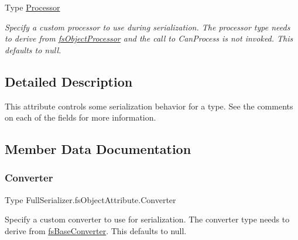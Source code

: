 \begin{DoxyCompactItemize}
Type \hyperlink{class_full_serializer_1_1fs_object_attribute_a2f71f5d718abe0eb30544ff6f8510664}{Processor}
\begin{DoxyCompactList}\small\item\em Specify a custom processor to use during serialization. The processor type needs to derive from \hyperlink{class_full_serializer_1_1fs_object_processor}{fs\+Object\+Processor} and the call to Can\+Process is not invoked. This defaults to null. \end{DoxyCompactList}\end{DoxyCompactItemize}


\subsection{Detailed Description}
This attribute controls some serialization behavior for a type. See the comments on each of the fields for more information. 



\subsection{Member Data Documentation}
\mbox{\label{class_full_serializer_1_1fs_object_attribute_abe3f1e8c04164f6d951c70c15870df71}} 
\subsubsection{\texorpdfstring{Converter}{Converter}}
{\footnotesize\ttfamily Type Full\+Serializer.\+fs\+Object\+Attribute.\+Converter}



Specify a custom converter to use for serialization. The converter type needs to derive from \hyperlink{class_full_serializer_1_1fs_base_converter}{fs\+Base\+Converter}. This defaults to null. 

\mbox{\label{class_full_serializer_1_1fs_object_attribute_afcdb79992b507e9e9c04111c6a9edadc}} 
